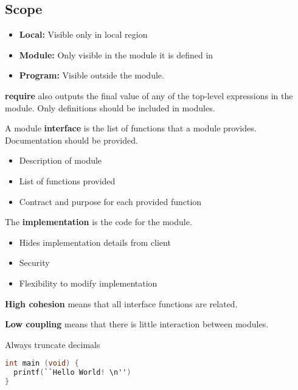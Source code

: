 \documentclass[english, 12pt]{article}
\begin{document}
\subsection{Scope}
\begin{itemize}
\item \textbf{Local:} Visible only in local region
\item \textbf{Module:} Only visible in the module it is defined in
\item \textbf{Program:} Visible outside the module.
\end{itemize}
\begin{qte}
\textbf{require} also outputs the final value of any of the top-level expressions in the module. Only definitions should be included in modules.
\end{qte}
\begin{defn}
A module \textbf{interface} is the list of functions that a module provides. Documentation should be provided.
\begin{itemize}
\item Description of module
\item List of functions provided
\item Contract and purpose for each provided function
\end{itemize}
\end{defn}
\begin{defn}
The \textbf{implementation} is the code for the module.
\begin{itemize}
\item Hides implementation details from client
\item Security
\item Flexibility to modify implementation
\end{itemize}
\end{defn}

\begin{defn}
\textbf{High cohesion} means that all interface functions are related.
\end{defn}
\begin{defn}
\textbf{Low coupling} means that there is little interaction between modules.
\end{defn}

\begin{qte}
Always truncate decimals
\end{qte}



\begin{lstlisting}[language=C]
int main (void) {
  printf(``Hello World! \n'')
}
\end{lstlisting}
\end{document}
